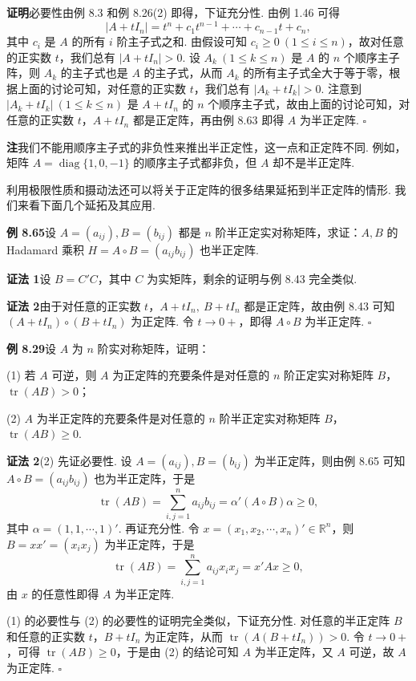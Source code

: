 \documentclass[UTF8, 12pt, fontset=fandol, oneside]{ctexart}
\begin{document}
\noindent\textbf{证明}\quad 必要性由例 8.3 和例 8.26(2) 即得，下证充分性. 由例 1.46 可得
\[
|A+tI_n|=t^n+c_1t^{n-1}+\cdots+c_{n-1}t+c_n,
\]
其中 $c_i$ 是 $A$ 的所有 $i$ 阶主子式之和. 由假设可知 $c_i\ge 0\ (1\le i\le n)$，故对任意的正实数 $t$，我们总有 $|A+tI_n|>0$. 设 $A_k\ (1\le k\le n)$ 是 $A$ 的 $n$ 个顺序主子阵，则 $A_k$ 的主子式也是 $A$ 的主子式，从而 $A_k$ 的所有主子式全大于等于零，根据上面的讨论可知，对任意的正实数 $t$，我们总有 $|A_k+tI_k|>0$. 注意到 $|A_k+tI_k|\ (1\le k\le n)$ 是 $A+tI_n$ 的 $n$ 个顺序主子式，故由上面的讨论可知，对任意的正实数 $t$，$A+tI_n$ 都是正定阵，再由例 8.63 即得 $A$ 为半正定阵. $\ensuremath{\square}$

\noindent\textbf{注}\quad 我们不能用顺序主子式的非负性来推出半正定性，这一点和正定阵不同. 例如，矩阵 $A=\operatorname{diag}\{1,0,-1\}$ 的顺序主子式都非负，但 $A$ 却不是半正定阵.

利用极限性质和摄动法还可以将关于正定阵的很多结果延拓到半正定阵的情形. 我们来看下面几个延拓及其应用.

\noindent\textbf{例 8.65}\quad 设 $A=(a_{ij}),B=(b_{ij})$ 都是 $n$ 阶半正定实对称矩阵，求证：$A,B$ 的 Hadamard 乘积 $H=A\circ B=(a_{ij}b_{ij})$ 也半正定阵.

\noindent\textbf{证法 1}\quad 设 $B=C'C$，其中 $C$ 为实矩阵，剩余的证明与例 8.43 完全类似.

\noindent\textbf{证法 2}\quad 由于对任意的正实数 $t$，$A+tI_n,\ B+tI_n$ 都是正定阵，故由例 8.43 可知 $(A+tI_n)\circ(B+tI_n)$ 为正定阵. 令 $t\to 0+$，即得 $A\circ B$ 为半正定阵. $\ensuremath{\square}$

\noindent\textbf{例 8.29}\quad 设 $A$ 为 $n$ 阶实对称矩阵，证明：

(1) 若 $A$ 可逆，则 $A$ 为正定阵的充要条件是对任意的 $n$ 阶正定实对称矩阵 $B$，$\operatorname{tr}(AB)>0$；

(2) $A$ 为半正定阵的充要条件是对任意的 $n$ 阶半正定实对称矩阵 $B$，$\operatorname{tr}(AB)\ge 0$.

\noindent\textbf{证法 2}\quad (2) 先证必要性. 设 $A=(a_{ij}),B=(b_{ij})$ 为半正定阵，则由例 8.65 可知 $A\circ B=(a_{ij}b_{ij})$ 也为半正定阵，于是
\[
\operatorname{tr}(AB)=\sum_{i,j=1}^n a_{ij}b_{ij}=\alpha'(A\circ B)\alpha\ge 0,
\]
其中 $\alpha=(1,1,\cdots,1)'$. 再证充分性. 令 $x=(x_1,x_2,\cdots,x_n)'\in\mathbb{R}^n$，则 $B=xx'=(x_ix_j)$ 为半正定阵，于是
\[
\operatorname{tr}(AB)=\sum_{i,j=1}^n a_{ij}x_ix_j=x'Ax\ge 0,
\]
由 $x$ 的任意性即得 $A$ 为半正定阵.

(1) 的必要性与 (2) 的必要性的证明完全类似，下证充分性. 对任意的半正定阵 $B$ 和任意的正实数 $t$，$B+tI_n$ 为正定阵，从而 $\operatorname{tr}(A(B+tI_n))>0$. 令 $t\to 0+$，可得 $\operatorname{tr}(AB)\ge 0$，于是由 (2) 的结论可知 $A$ 为半正定阵，又 $A$ 可逆，故 $A$ 为正定阵. $\ensuremath{\square}$
\end{document}

